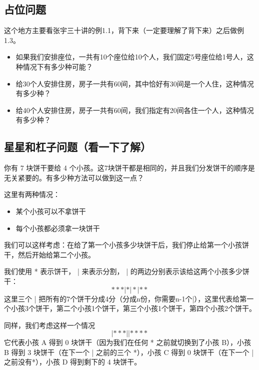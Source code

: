 \documentclass[lang=cn,math=mtpro2,11pt,scheme=chinese,pad]{elegantbook}
\begin{document}
\subsection{占位问题}

这个地方主要看张宇三十讲的例1.1，背下来（一定要理解了背下来）之后做例1.3。

\begin{example}
  \begin{itemize}
    \item 如果我们安排座位，一共有10个座位给10个人，我们固定5号座位给1号人，这种情况下有多少种可能？
    \item 给30个人安排住房，房子一共有60间，其中恰好有30间是一个人住，这种情况有多少种？
    \item 给40个人安排住房，房子一共有60间，我们指定有20间各住一个人，这种情况有多少种？
  \end{itemize}
\end{example}

\subsection{星星和杠子问题（看一下了解）}

\begin{example}
  你有 7 块饼干要给 4 个小孩。这7块饼干都是相同的，并且我们分发饼干的顺序是无关紧要的。有多少种方法可以做到这一点？
\end{example}
\begin{note}
  这里有两种情况：
  \begin{itemize}
    \item 某个小孩可以不拿饼干
    \item 每个小孩都必须拿一块饼干
  \end{itemize}
\end{note}

我们可以这样考虑：在给了第一个小孩多少块饼干后，我们停止给第一个小孩饼干，然后开始给第二个小孩。

我们使用 * 表示饼干， | 来表示分割， | 的两边分别表示该给这两个小孩多少饼干：
\[
*** | * | * | **
\]
这里三个 | 把所有的7个饼干分成4分（分成n份，你需要n-1个|），这里代表给第一个小孩3个饼干，第二个小孩1个饼干，第三个小孩1个饼干，第四个小孩2个饼干。

同样，我们考虑这样一个情况
\[
| *** | | ****
\]
它代表小孩 A 得到 0 块饼干（因为我们在任何 * 之前就切换到了小孩 B），小孩 B 得到 3 块饼干（在下一个 | 之前的三个 *），小孩 C 得到 0 块饼干（在下一个 | 之前没有*），小孩 D 得到剩下的 4 块饼干。
\end{document}
